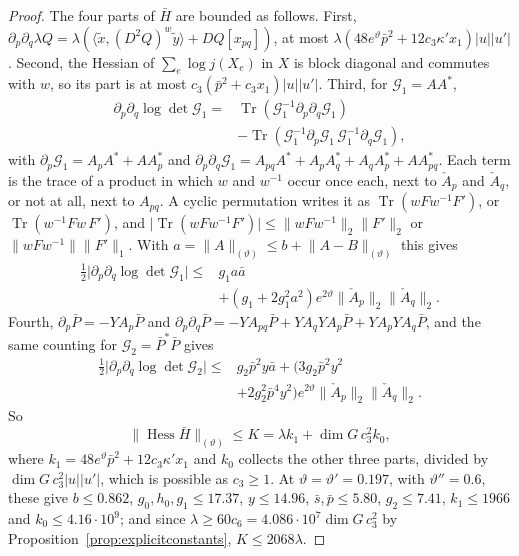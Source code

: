 \documentclass[11pt]{amsart}
\theoremstyle{definition}
\theoremstyle{remark}
\numberwithin{equation}{section}
\newcommand{\Tr}{\operatorname{Tr}}
\begin{document}
\begin{proof}
The four parts of $\bar H$ are bounded as follows. First, $\partial_p
\partial_q\lambda Q=\lambda(\langle\tilde x,(D^2Q)^w\tilde y\rangle+DQ[x_{pq}
])$, at most $\lambda(48e^\vartheta\bar p^2+12c_3\kappa'x_1)\lvert u\rvert
\lvert u'\rvert$. Second, the Hessian of $\sum_e\log j(X_e)$ in $X$ is block
diagonal and commutes with $w$, so its part is at most $c_3(\bar p^2+c_3x_1)
\lvert u\rvert\lvert u'\rvert$. Third, for $\mathcal G_1=AA^*$,
\[
\begin{split}
\partial_p\partial_q\log\det\mathcal G_1={}&\Tr(\mathcal G_1^{-1}\partial_p
\partial_q\mathcal G_1)\\
&-\Tr(\mathcal G_1^{-1}\partial_p\mathcal G_1\,\mathcal G_1^{-1}\partial_q
\mathcal G_1),
\end{split}
\]
with $\partial_p\mathcal G_1=A_pA^*+AA_p^*$ and $\partial_p\partial_q\mathcal
G_1=A_{pq}A^*+A_pA_q^*+A_qA_p^*+AA_{pq}^*$. Each term is the trace of a
product in which $w$ and $w^{-1}$ occur once each, next to $\check A_p$ and
$\check A_q$, or not at all, next to $A_{pq}$. A cyclic permutation writes it
as $\Tr(wFw^{-1}F')$, or $\Tr(w^{-1}Fw\,F')$, and $\lvert\Tr(wFw^{-1}F')\rvert
\le\lVert wFw^{-1}\rVert_2\lVert F'\rVert_2$ or $\lVert wFw^{-1}\rVert\lVert
F'\rVert_1$. With $a=\lVert A\rVert_{(\vartheta)}\le b+\lVert A-B\rVert_{(
\vartheta)}$ this gives
\[
\begin{split}
\tfrac12\lvert\partial_p\partial_q\log\det\mathcal G_1\rvert\le{}&g_1a\bar a
\\
&+(g_1+2g_1^2a^2)e^{2\vartheta}\lVert\check A_p\rVert_2\lVert\check A_q\rVert
_2.
\end{split}
\]
Fourth, $\partial_p\bar P=-YA_p\bar P$ and $\partial_p\partial_q\bar P=-YA_{pq}
\bar P+YA_qYA_p\bar P+YA_pYA_q\bar P$, and the same counting for $\mathcal G
_2=\bar P^*\bar P$ gives
\[
\begin{split}
\tfrac12\lvert\partial_p\partial_q\log\det\mathcal G_2\rvert\le{}&g_2\bar p^2
y\bar a+(3g_2\bar p^2y^2\\
&+2g_2^2\bar p^4y^2)e^{2\vartheta}\lVert\check A_p\rVert_2\lVert\check A_q
\rVert_2.
\end{split}
\]
So
\[
\lVert\operatorname{Hess}\bar H\rVert_{(\vartheta)}\le K=\lambda k_1+\dim
G\,c_3^2k_0,
\]
where $k_1=48e^\vartheta\bar p^2+12c_3\kappa'x_1$ and $k_0$
collects the other three parts, divided by $\dim G\,c_3^2\lvert u\rvert
\lvert u'\rvert$, which is possible as $c_3\ge1$. At $\vartheta=\vartheta'=
0.197$, with $\vartheta''=0.6$, these give $b\le0.862$, $g_0,h_0,g_1\le
17.37$, $y\le14.96$, $\bar s,\bar p\le5.80$, $g_2\le7.41$, $k_1\le1966$ and
$k_0\le4.16\cdot10^9$; and since $\lambda\ge60c_6=4.086\cdot10^7\dim G\,c_3
^2$ by Proposition~\ref{prop:explicitconstants}, $K\le2068\lambda$.


\end{proof}
\end{document}
